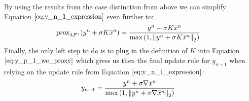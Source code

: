 By using the results from the case distinction from above we can simplify Equation $\ref{eq:y_n_1_expression}$ even further to:
\begin{equation}
	\text{prox}_{\lambda F^*}(y^n + \sigma K \bar{x}^{n}) = \frac{y^n + \sigma K \bar{x}^{n}}{\max{\left(1,\left\lVert y^n + \sigma K \bar{x}^{n}\right\rVert_2 \right)}}
\label{eq:y_p_1_we_proxy}	
\end{equation}
Finally, the only left step to do is to plug in the definition of $K$ into Equation $\ref{eq:y_p_1_we_proxy}$ which gives us then the final update rule for $y_{n+1}$ when relying on the update rule from Equation $\ref{eq:y_n_1_expression}$:
\begin{align}
	y_{n+1} = \frac{y^n + \sigma \nabla \bar{x}^{n}}{\max{\left(1,\left\lVert y^n + \sigma \nabla \bar{x}^{n}\right\rVert_2 \right)}}
\label{eq:update_rule_y_n_p_1}	
\end{align} 	

